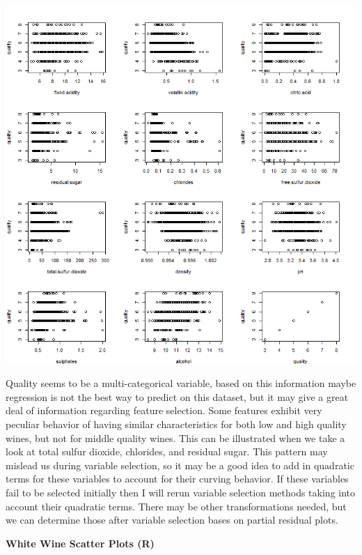 \documentclass{article}
\begin{document}
	\includegraphics[scale=0.7]{../plots/Wine/red_wine_Rscatter.png}
	\newline
	
	Quality seems to be a multi-categorical variable, based on this information maybe regression is not the best
	way to predict on this dataset, but it may give a great deal of information regarding feature selection. Some
	features exhibit very peculiar behavior of having similar characteristics for both low and high quality wines, but
	not for middle quality wines. This can be illustrated when we take a look at total sulfur dioxide, chlorides, and 
	residual sugar. This pattern may mislead us during variable selection, so it may be a good idea to add in 
	quadratic terms for these variables to account for their curving behavior. If these variables fail to be selected 
	initially then I will rerun variable selection methods taking into account their quadratic terms. There may 
	be other transformations needed, but we can determine those after variable selection bases on partial residual 
	plots. 
	
	\newpage
	
	\textbf{White Wine Scatter Plots (R)} 
	
\end{document}
